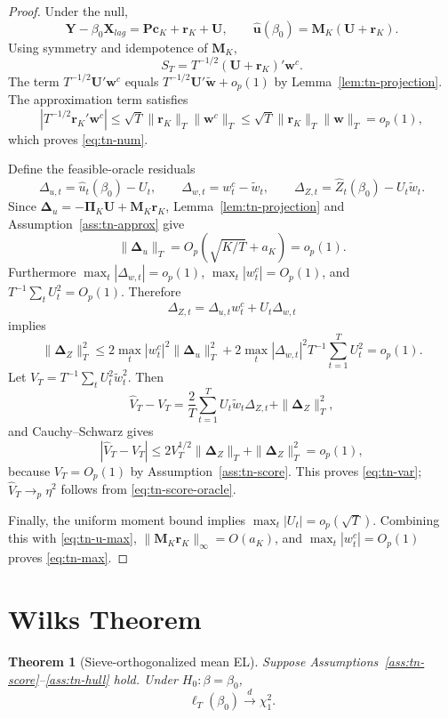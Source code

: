 \documentclass[11pt]{article}
\newtheorem{theorem}{Theorem}
\begin{document}
\begin{proof}
Under the null,
\[
    \bm Y-\beta_0\bm X_{lag}=\bm P\bm c_K+\bm r_K+\bm U,
    \qquad
    \widehat{\bm u}(\beta_0)=\bm M_K(\bm U+\bm r_K).
\]
Using symmetry and idempotence of \(\bm M_K\),
\[
    S_T=T^{-1/2}(\bm U+\bm r_K)'\bm w^c.
\]
The term \(T^{-1/2}\bm U'\bm w^c\) equals \(T^{-1/2}\bm U'\widetilde{\bm w}+o_p(1)\) by Lemma~\ref{lem:tn-projection}. The approximation term satisfies
\[
    |T^{-1/2}\bm r_K'\bm w^c|
    \leq \sqrt T\|\bm r_K\|_T\|\bm w^c\|_T
    \leq \sqrt T\|\bm r_K\|_T\|\bm w\|_T=o_p(1),
\]
which proves \eqref{eq:tn-num}.

Define the feasible-oracle residuals
\[
    \Delta_{u,t}=\widehat u_t(\beta_0)-U_t,
    \qquad
    \Delta_{w,t}=w_t^c-\widetilde w_t,
    \qquad
    \Delta_{Z,t}=\widehat Z_t(\beta_0)-U_t\widetilde w_t.
\]
Since \(\bm\Delta_u=-\bm\Pi_K\bm U+\bm M_K\bm r_K\), Lemma~\ref{lem:tn-projection} and Assumption~\ref{ass:tn-approx} give
\[
    \|\bm\Delta_u\|_T=O_p(\sqrt{K/T}+a_K)=o_p(1).
\]
Furthermore \(\max_t|\Delta_{w,t}|=o_p(1)\), \(\max_t|w_t^c|=O_p(1)\), and \(T^{-1}\sum_tU_t^2=O_p(1)\). Therefore
\[
    \Delta_{Z,t}=\Delta_{u,t}w_t^c+U_t\Delta_{w,t}
\]
implies
\[
    \|\bm\Delta_Z\|_T^2
    \leq2\max_t|w_t^c|^2\|\bm\Delta_u\|_T^2
       +2\max_t|\Delta_{w,t}|^2T^{-1}\sum_{t=1}^TU_t^2=o_p(1).
\]
Let \(V_T=T^{-1}\sum_tU_t^2\widetilde w_t^2\). Then
\[
    \widehat V_T-V_T
      =\frac2T\sum_{t=1}^TU_t\widetilde w_t\Delta_{Z,t}+\|\bm\Delta_Z\|_T^2,
\]
and Cauchy--Schwarz gives
\[
    |\widehat V_T-V_T|
      \leq2V_T^{1/2}\|\bm\Delta_Z\|_T+\|\bm\Delta_Z\|_T^2=o_p(1),
\]
because \(V_T=O_p(1)\) by Assumption~\ref{ass:tn-score}. This proves \eqref{eq:tn-var}; \(\widehat V_T\to_p\eta^2\) follows from \eqref{eq:tn-score-oracle}.

Finally, the uniform moment bound implies \(\max_t|U_t|=o_p(\sqrt T)\). Combining this with \eqref{eq:tn-u-max}, \(\|\bm M_K\bm r_K\|_\infty=O(a_K)\), and \(\max_t|w_t^c|=O_p(1)\) proves \eqref{eq:tn-max}.
\end{proof}

\section{Wilks Theorem}

\begin{theorem}[Sieve-orthogonalized mean EL]
\label{thm:tn-wilks}
Suppose Assumptions~\ref{ass:tn-score}--\ref{ass:tn-hull} hold. Under \(H_0:\beta=\beta_0\),
\[
    \ell_T(\beta_0)\xrightarrow{d}\chi_1^2.
\]
\end{theorem}
\end{document}

